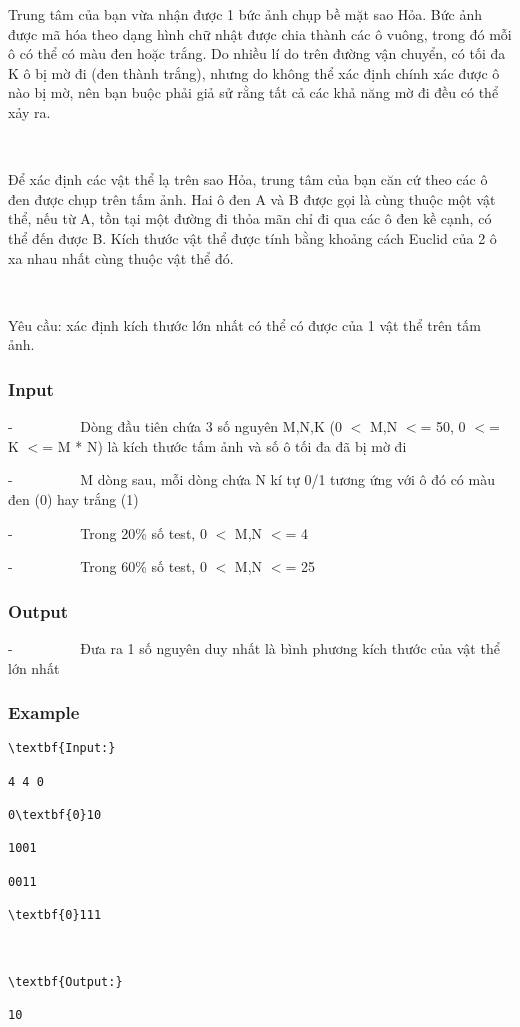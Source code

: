 

Trung tâm của bạn vừa nhận được 1 bức ảnh chụp bề mặt sao Hỏa. Bức ảnh được mã hóa theo dạng hình chữ nhật được chia thành các ô vuông, trong đó mỗi ô có thể có màu đen hoặc trắng. Do nhiều lí do trên đường vận chuyển, có tối đa K ô bị mờ đi (đen thành trắng), nhưng do không thể xác định chính xác được ô nào bị mờ, nên bạn buộc phải giả sử rằng tất cả các khả năng mờ đi đều có thể xảy ra.

 

Để xác định các vật thể lạ trên sao Hỏa, trung tâm của bạn căn cứ theo các ô đen được chụp trên tấm ảnh. Hai ô đen A và B được gọi là cùng thuộc một vật thể, nếu từ A, tồn tại một đường đi thỏa mãn chỉ đi qua các ô đen kề cạnh, có thể đến được B. Kích thước vật thể được tính bằng khoảng cách Euclid của 2 ô xa nhau nhất cùng thuộc vật thể đó.

 

Yêu cầu: xác định kích thước lớn nhất có thể có được của 1 vật thể trên tấm ảnh.

\subsubsection{Input}

-          Dòng đầu tiên chứa 3 số nguyên M,N,K (0 $<$ M,N $<$= 50, 0 $<$= K $<$= M * N) là kích thước tấm ảnh và số ô tối đa đã bị mờ đi

-          M dòng sau, mỗi dòng chứa N kí tự 0/1 tương ứng với ô đó có màu đen (0) hay trắng (1)

-          Trong 20\% số test, 0 $<$ M,N $<$= 4

-          Trong 60\% số test, 0 $<$ M,N $<$= 25

\subsubsection{Output}

-          Đưa ra 1 số nguyên duy nhất là bình phương kích thước của vật thể lớn nhất

\subsubsection{Example}
\begin{verbatim}
\textbf{Input:}

4 4 0

0\textbf{0}10

1001

0011

\textbf{0}111



\textbf{Output:}

10\end{verbatim}

